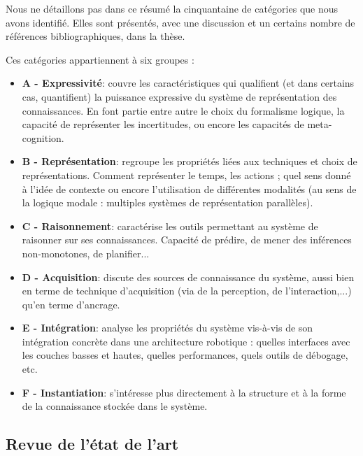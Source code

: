 Nous ne détaillons pas dans ce résumé la cinquantaine de catégories que nous
avons identifié. Elles sont présentés, avec une discussion et un certains
nombre de références bibliographiques, dans la thèse.

Ces catégories appartiennent à six groupes :

\begin{itemize}
    
    \item \textbf{A - Expressivité}: couvre les caractéristiques qui qualifient
        (et dans certains cas, quantifient) la puissance expressive du système
        de représentation des connaissances. En font partie entre autre le
        choix du formalisme logique, la capacité de représenter les
        incertitudes, ou encore les capacités de meta-cognition.

    \item \textbf{B - Représentation}: regroupe les propriétés liées aux
        techniques et choix de représentations. Comment représenter le temps,
        les actions ; quel sens donné à l'idée de contexte ou encore
        l'utilisation de différentes modalités (au sens de la logique modale :
        multiples systèmes de représentation parallèles).

    \item \textbf{C - Raisonnement}: caractérise les outils permettant au
        système de raisonner sur ses connaissances. Capacité de prédire, de
        mener des inférences non-monotones, de planifier...
    
    \item \textbf{D - Acquisition}: discute des sources de connaissance du
        système, aussi bien en terme de technique d'acquisition (via de la
        perception, de l'interaction,...) qu'en terme d'ancrage.
    
    \item \textbf{E - Intégration}: analyse les propriétés du système vis-à-vis
        de son intégration concrète dans une architecture robotique : quelles
        interfaces avec les couches basses et hautes, quelles performances,
        quels outils de débogage, etc.
    
    \item \textbf{F - Instantiation}: s'intéresse plus directement à la
        structure et à la forme de la connaissance stockée dans le système.

\end{itemize}

\subsection{Revue de l'état de l'art}
\label{sect|surveyed-systems}



